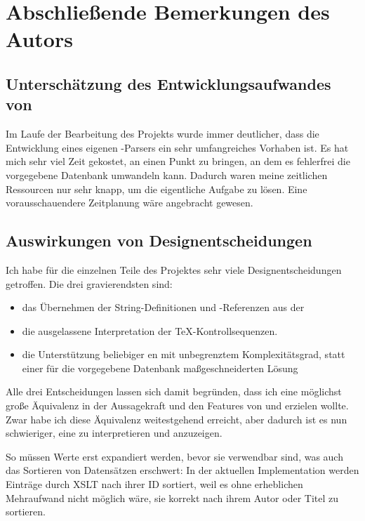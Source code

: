 \section{Abschließende Bemerkungen des Autors}

\subsection{Unterschätzung des Entwicklungsaufwandes von }

Im Laufe der Bearbeitung des Projekts wurde immer deutlicher, dass die
Entwicklung eines eigenen \mbox{\BibTeX-}Parsers ein sehr umfangreiches Vorhaben
ist. Es hat mich sehr viel Zeit gekostet,  an einen Punkt zu
bringen, an dem es fehlerfrei die vorgegebene Datenbank umwandeln kann. Dadurch
waren meine zeitlichen Ressourcen nur sehr knapp, um die eigentliche Aufgabe zu
lösen. Eine vorausschauendere Zeitplanung wäre angebracht gewesen.

\subsection{Auswirkungen von Designentscheidungen}

Ich habe für die einzelnen Teile des Projektes sehr viele Designentscheidungen
getroffen. Die drei gravierendsten sind:
\begin{itemize}
    \item das Übernehmen der String-Definitionen und -Referenzen aus der
        \BibTeXdatabase{}
    \item die ausgelassene Interpretation der \mbox{\TeX-}Kontrollsequenzen.
    \item die Unterstützung beliebiger \BibTeXdatabase en mit unbegrenztem
        Komplexitätsgrad, statt einer für die vorgegebene Datenbank
        maßgeschneiderten Lösung
\end{itemize}
Alle drei Entscheidungen lassen sich damit begründen, dass ich eine möglichst
große Äquivalenz in der Aussagekraft und den Features von \BibTeX{} und
\BibTeXXML{} erzielen wollte. Zwar habe ich diese Äquivalenz weitestgehend
erreicht, aber dadurch ist es nun schwieriger, eine \BibTeXXMLdatabase{} zu
interpretieren und anzuzeigen.

So müssen Werte erst expandiert werden, bevor sie verwendbar sind, was auch das
Sortieren von Datensätzen erschwert: In der aktuellen Implementation werden
Einträge durch XSLT nach ihrer ID sortiert, weil es ohne erheblichen Mehraufwand
nicht möglich wäre, sie korrekt nach ihrem Autor oder Titel zu sortieren.

